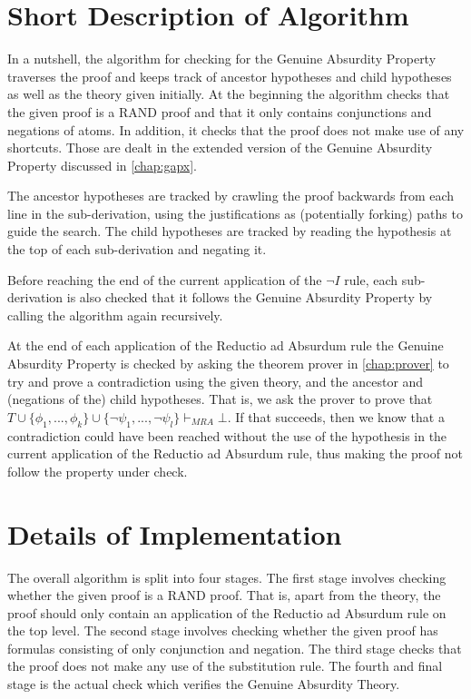 \documentclass[11pt,twoside,a4paper]{report}
\begin{document}
\section{Short Description of Algorithm}
In a nutshell, the algorithm for checking for the Genuine Absurdity Property traverses the proof and keeps track of ancestor hypotheses and child hypotheses as well as the theory given initially. At the beginning the algorithm checks that the given proof is a RAND proof and that it only contains conjunctions and negations of atoms. In addition, it checks that the proof does not make use of any shortcuts. Those are dealt in the extended version of the Genuine Absurdity Property discussed in \autoref{chap:gapx}.

The ancestor hypotheses are tracked by crawling the proof backwards from each line in the sub-derivation, using the justifications as (potentially forking) paths to guide the search. The child hypotheses are tracked by reading the hypothesis at the top of each sub-derivation and negating it.

Before reaching the end of the current application of the $\neg I$ rule, each sub-derivation is also checked that it follows the Genuine Absurdity Property by calling the algorithm again recursively.

At the end of each application of the Reductio ad Absurdum rule the Genuine Absurdity Property is checked by asking the theorem prover in \autoref{chap:prover} to try and prove a contradiction using the given theory, and the ancestor and (negations of the) child hypotheses. That is, we ask the prover to prove that $T\cup\{\phi_1, ..., \phi_k\}\cup\{\neg\psi_1, ..., \neg\psi_l\}\vdash_{MRA}\bot$. If that succeeds, then we know that a contradiction could have been reached without the use of the hypothesis in the current application of the Reductio ad Absurdum rule, thus making the proof not follow the property under check.

\section{Details of Implementation}
The overall algorithm is split into four stages. The first stage involves checking whether the given proof is a RAND proof. That is, apart from the theory, the proof should only contain an application of the Reductio ad Absurdum rule on the top level. The second stage involves checking whether the given proof has formulas consisting of only conjunction and negation. The third stage checks that the proof does not make any use of the substitution rule. The fourth and final stage is the actual check which verifies the Genuine Absurdity Theory.
\end{document}
